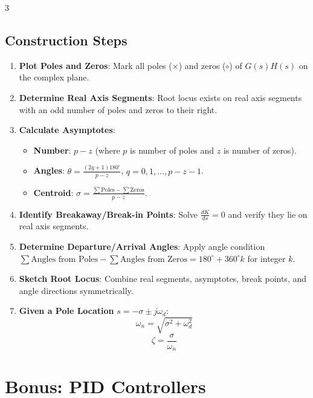 \documentclass[letterpaper,10pt]{article}
\begin{document}
\begin{multicols}{3}
\subsection*{Construction Steps}

\begin{enumerate}[leftmargin=*]
    \item \textbf{Plot Poles and Zeros}: Mark all poles (\( \times \)) and zeros (\( \circ \)) of \( G(s)H(s) \) on the complex plane.
    
    \item \textbf{Determine Real Axis Segments}: Root locus exists on real axis segments with an odd number of poles and zeros to their right.
    
    \item \textbf{Calculate Asymptotes}:
    \begin{itemize}[leftmargin=*]
        \item \textbf{Number}: \( p - z \) (where \( p \) is number of poles and \( z \) is number of zeros).
        \item \textbf{Angles}: \( \theta = \frac{(2q + 1)180^\circ}{p - z} \), \( q = 0,1,\ldots,p-z-1 \).
        \item \textbf{Centroid}: \( \sigma = \frac{\sum \text{Poles} - \sum \text{Zeros}}{p - z} \).
    \end{itemize}
    
    \item \textbf{Identify Breakaway/Break-in Points}: Solve \( \frac{dK}{ds} = 0 \) and verify they lie on real axis segments.
    
    \item \textbf{Determine Departure/Arrival Angles}: Apply angle condition \( \sum \text{Angles from Poles} - \sum \text{Angles from Zeros} = 180^\circ + 360^\circ k \) for integer \( k \).
    
    \item \textbf{Sketch Root Locus}: Combine real segments, asymptotes, break points, and angle directions symmetrically.

    \item \textbf{Given a Pole Location} \( s = -\sigma \pm j\omega_d \):
    \[
    \omega_n = \sqrt{\sigma^2 + \omega_d^2}
    \]
    \[
    \zeta = \frac{\sigma}{\omega_n}
    \]
\end{enumerate}



\section*{Bonus: PID Controllers}

\end{multicols}
\end{document}
